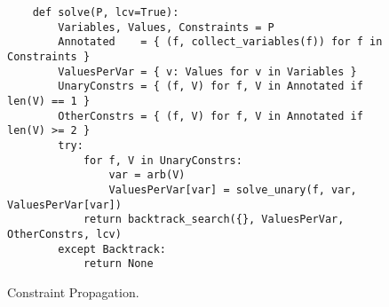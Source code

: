 \begin{figure}[!ht]
\centering
\begin{verbatim}
    def solve(P, lcv=True):
        Variables, Values, Constraints = P
        Annotated    = { (f, collect_variables(f)) for f in Constraints }
        ValuesPerVar = { v: Values for v in Variables }
        UnaryConstrs = { (f, V) for f, V in Annotated if len(V) == 1 }
        OtherConstrs = { (f, V) for f, V in Annotated if len(V) >= 2 }
        try:
            for f, V in UnaryConstrs:
                var = arb(V)
                ValuesPerVar[var] = solve_unary(f, var, ValuesPerVar[var])
            return backtrack_search({}, ValuesPerVar, OtherConstrs, lcv)
        except Backtrack:
            return None
\end{verbatim}
\vspace*{-0.3cm}
\caption{Constraint Propagation.}
\label{fig:Constraint-Propagation-Solver.ipynb:solve}
\end{figure}

